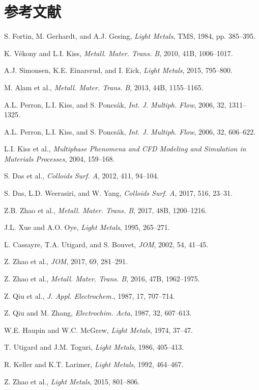 \documentclass[UTF8,zihao=-4,fontset=fandol]{ctexart}
\begin{document}
\section*{参考文献}
\small
\begin{enumerate}[label={[\arabic*]},leftmargin=2.8em,itemsep=0.15em]
\item S. Fortin, M. Gerhardt, and A.J. Gesing, \emph{Light Metals}, TMS, 1984, pp. 385--395.
\item K. V\'ekony and L.I. Kiss, \emph{Metall. Mater. Trans. B}, 2010, 41B, 1006--1017.
\item A.J. Simonsen, K.E. Einarsrud, and I. Eick, \emph{Light Metals}, 2015, 795--800.
\item M. Alam et al., \emph{Metall. Mater. Trans. B}, 2013, 44B, 1155--1165.
\item A.L. Perron, L.I. Kiss, and S. Poncs\'ak, \emph{Int. J. Multiph. Flow}, 2006, 32, 1311--1325.
\item A.L. Perron, L.I. Kiss, and S. Poncs\'ak, \emph{Int. J. Multiph. Flow}, 2006, 32, 606--622.
\item L.I. Kiss et al., \emph{Multiphase Phenomena and CFD Modeling and Simulation in Materials Processes}, 2004, 159--168.
\item S. Das et al., \emph{Colloids Surf. A}, 2012, 411, 94--104.
\item S. Das, L.D. Weerasiri, and W. Yang, \emph{Colloids Surf. A}, 2017, 516, 23--31.
\item Z.B. Zhao et al., \emph{Metall. Mater. Trans. B}, 2017, 48B, 1200--1216.
\item J.L. Xue and A.O. Oye, \emph{Light Metals}, 1995, 265--271.
\item L. Cassayre, T.A. Utigard, and S. Bouvet, \emph{JOM}, 2002, 54, 41--45.
\item Z. Zhao et al., \emph{JOM}, 2017, 69, 281--291.
\item Z. Zhao et al., \emph{Metall. Mater. Trans. B}, 2016, 47B, 1962--1975.
\item Z. Qiu et al., \emph{J. Appl. Electrochem.}, 1987, 17, 707--714.
\item Z. Qiu and M. Zhang, \emph{Electrochim. Acta}, 1987, 32, 607--613.
\item W.E. Haupin and W.C. McGrew, \emph{Light Metals}, 1974, 37--47.
\item T. Utigard and J.M. Toguri, \emph{Light Metals}, 1986, 405--413.
\item R. Keller and K.T. Larimer, \emph{Light Metals}, 1992, 464--467.
\item Z. Zhao et al., \emph{Light Metals}, 2015, 801--806.

\end{enumerate}
\end{document}
